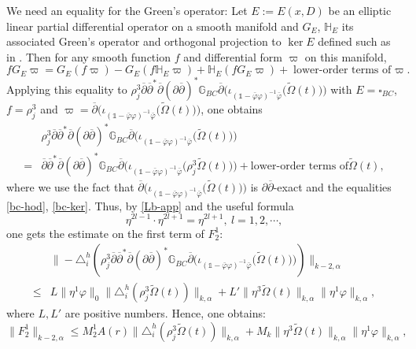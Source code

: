 \documentclass[12pt]{amsart}
\numberwithin{equation}{section}
\renewcommand{\1}{\mathds{1}}
\newcommand{\G}{\mathbb{G}}
\newcommand{\db}{\overline{\partial}}
\renewcommand{\>}{\rightarrow}
\newcommand{\p}{\partial}
\def\p{\partial}
\def\b{\bar}
\begin{document}
We need an equality for the Green's operator: Let $E:=E(x, D)$ be an
elliptic linear partial differential operator on a smooth manifold
 and $G_E$, $\mathbb{H}_E$ its associated Green's operator and orthogonal projection to $\ker E$ defined such as in
\cite[Appendix.Definition 7.2]{k}. Then for any smooth function $f$
and differential form $\varpi$ on this manifold,
\begin{equation}\label{leibniz}
fG_E\varpi=G_E(f\varpi)-G_E(f\mathbb{H}_E\varpi)+\mathbb{H}_E(fG_E\varpi)+\text{lower-order
terms of $\varpi$}.
\end{equation}
Applying this equality to $\rho_j^3\db \db^*\db(\p\db)^* \G_{BC} \db
\Big( \iota_{(\1-\b{\varphi}\varphi)^{-1}\b{\varphi}} \big(
\tilde{\Omega}(t) \big) \Big)$ with $E=\square_{BC}$, $f=\rho_j^3$
and $\varpi=\db \Big(
\iota_{(\1-\b{\varphi}\varphi)^{-1}\b{\varphi}} \big(
\tilde{\Omega}(t) \big) \Big)$, one obtains
\begin{equation}\label{Lb-app}
\begin{aligned}
   &\rho_j^3\db \db^*\db(\p\db)^* \G_{BC} \db \Big(
\iota_{(\1-\b{\varphi}\varphi)^{-1}\b{\varphi}} \big(
\tilde{\Omega}(t) \big) \Big)\\
 =&\db \db^*\db(\p\db)^* \G_{BC} \db \Big(
\iota_{(\1-\b{\varphi}\varphi)^{-1}\b{\varphi}} \big(\rho_j^3
\tilde{\Omega}(t) \big) \Big)+\text{lower-order terms of
$\tilde{\Omega}(t)$},
\end{aligned}
\end{equation}
where we use the fact that $\db \Big(
\iota_{(\1-\b{\varphi}\varphi)^{-1}\b{\varphi}} \big(
\tilde{\Omega}(t) \big) \Big)$ is $\p\db$-exact and the equalities
\eqref{bc-hod}, \eqref{bc-ker}. Thus, by \eqref{Lb-app} and the
useful formula
\begin{equation}\label{eta-2l-1-2l+1}
\eta^{2l-1}\cdot\eta^{2l+1}=\eta^{2l+1},\ l=1,2,\cdots,
\end{equation} one gets the estimate on the first term of
$F_2^1$: $$\label{}
\begin{aligned}
   &\| -\triangle^h_i\left(\rho_j^3\db \db^*\db(\p\db)^* \G_{BC} \db \Big(
\iota_{(\1-\b{\varphi}\varphi)^{-1}\b{\varphi}} \big(
\tilde{\Omega}(t) \big) \Big)\right)\|_{k-2, \alpha}\\
 \leq& L\|\eta^1\varphi \|_{0}\|\triangle^h_i(\rho_j^3\tilde{\Omega}(t))\|_{k, \alpha}
 +L'\|\eta^3\tilde{\Omega}(t)\|_{k, \alpha}\|\eta^1\varphi\|_{k,
 \alpha},
\end{aligned}
$$
where $L,L'$ are positive numbers. Hence, one obtains:
\begin{equation}\label{M_2^1}
\| F_2^1\|_{k-2, \alpha}\leq
M_2^1A(r)\|\triangle^h_i(\rho_j^3\tilde{\Omega}(t))\|_{k, \alpha}
+M_k\|\eta^3\tilde{\Omega}(t)\|_{k, \alpha}\|\eta^1\varphi\|_{k,
 \alpha},
\end{equation}
\end{document}
